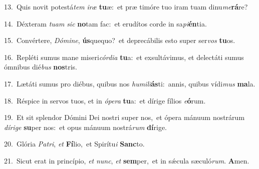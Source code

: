 {\numbfont\textcolor{\numbcolor}{13.}}~Quis novit potestá\textit{tem} \textit{i}\-\textit{ræ} \textbf{tu}\-æ:~\star et præ timóre tuo iram tuam dinu\-\textit{me}\-\textbf{rá}re?\par
{\numbfont\textcolor{\numbcolor}{14.}}~Déxteram \textit{tu}\-\textit{am} \textit{sic} \textbf{no}\-tam fac:~\star et erudítos corde in sa\-\textit{pi}\-\textbf{én}tia.\par
{\numbfont\textcolor{\numbcolor}{15.}}~Convértere, \textit{Dó}\-\textit{mi}\textit{ne}, \textbf{ús}\-quequo?~\star et deprecábilis esto super ser\textit{vos} \textbf{tu}\-os.\par
{\numbfont\textcolor{\numbcolor}{16.}}~Repléti sumus mane miseri\-\textit{cór}\-\textit{di}\textit{a} \textbf{tu}\-a:~\star et exsultávimus, et delectáti sumus ómnibus dié\textit{bus} \textbf{nos}\-tris.\par
{\numbfont\textcolor{\numbcolor}{17.}}~Lætáti sumus pro diébus, quibus nos \textit{hu}\-\textit{mi}\textit{li}\textbf{ás}ti:~\star annis, quibus vídi\textit{mus} \textbf{ma}\-la.\par
{\numbfont\textcolor{\numbcolor}{18.}}~Réspice in servos tuos, et in \textit{ó}\-\textit{pe}\textit{ra} \textbf{tu}\-a:~\star et dírige fílios \textit{e}\-\textbf{ó}rum.\par
{\numbfont\textcolor{\numbcolor}{19.}}~Et sit splendor Dómini Dei nostri super nos,~\dagger et ópera mánuum nostrárum \textit{dí}\-\textit{ri}\textit{ge} \textbf{su}\-per nos:~\star et opus mánuum nostrá\textit{rum} \textbf{dí}\-rige.\par
{\numbfont\textcolor{\numbcolor}{20.}}~Glória \textit{Pa}\-\textit{tri}, \textit{et} \textbf{Fí}\-lio,~\star et Spirítu\textit{i} \textbf{Sanc}\-to.\par
{\numbfont\textcolor{\numbcolor}{21.}}~Sicut erat in princípio, \textit{et} \textit{nunc}\-, \textit{et} \textbf{sem}\-per,~\star et in sǽcula sæculó\-\textit{rum}\-. \textbf{A}\-men.\par
